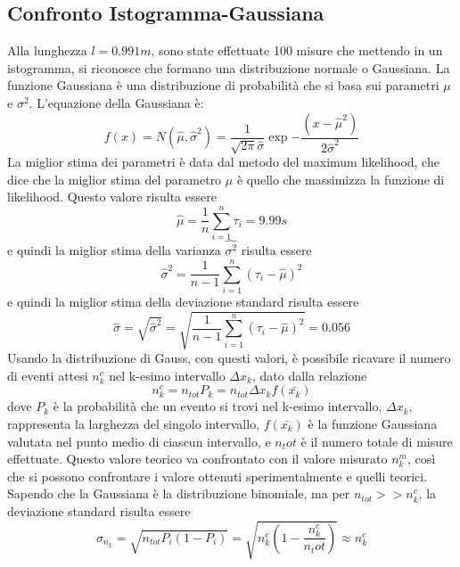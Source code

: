 \documentclass[a4paper]{article}
\begin{document}
\subsection{Confronto Istogramma-Gaussiana}
Alla lunghezza $l=0.991m$, sono state effettuate 100 misure che mettendo in un istogramma, si riconosce che formano una distribuzione normale o Gaussiana. La funzione Gaussiana è una distribuzione di probabilità che si basa sui parametri $\mu$ e $\sigma^2$. L'equazione della Gaussiana è:
\begin{equation}
    f(x)=N(\hat{\mu}, \hat{\sigma}^2) = \frac{1}{\sqrt{2\pi}\hat{\sigma}}\exp{-\frac{(x-\hat{\mu}^2)}{2\hat{\sigma}^2}}
\end{equation}
La miglior stima dei parametri è data dal metodo del maximum likelihood, che dice che la miglior stima del parametro $\mu$ è quello che massimizza la funzione di likelihood. Questo valore risulta essere 
\begin{equation}
    \hat{\mu} = \frac{1}{n} \sum_{i=1}^{n}\tau_i = 9.99s
\end{equation}
e quindi la miglior stima della varianza $\hat{\sigma^2}$ risulta essere 
\begin{equation}
    \hat{\sigma}^2 = \frac{1}{n-1} \sum_{i=1}^{n}(\tau_i - \hat{\mu})^2
\end{equation}
e quindi la miglior stima della deviazione standard risulta essere 
\begin{equation}
    \hat{\sigma} = \sqrt{\hat{\sigma}^2} = \sqrt{\frac{1}{n-1} \sum_{i=1}^{n}(\tau_i - \hat{\mu})^2} = 0.056
\end{equation}
Usando la distribuzione di Gauss, con questi valori, è possibile ricavare il numero di eventi attesi $n_k^c$ nel k-esimo intervallo $\Delta x_k$, dato dalla relazione 
\begin{equation}
    n^c_k = n_{tot} P_k = n_{tot} \Delta x_k f(\bar{x_k})
\end{equation}
dove $P_k$ è la probabilità che un evento si trovi nel k-esimo intervallo, $\Delta x_k$, rappresenta la larghezza del singolo intervallo, $f(\bar{x_k})$ è la funzione Gaussiana valutata nel punto medio di ciascun intervallo, e $n_tot$ è il numero totale di misure effettuate. Questo valore teorico va confrontato con il valore misurato $n^m_k$, così che si possono confrontare i valore ottenuti sperimentalmente e quelli teorici. Sapendo che la Gaussiana è la distribuzione binomiale, ma per $n_{tot} >> n_k^c$, la deviazione standard risulta essere 
\begin{equation}
    \sigma_{n_k} = \sqrt{n_{tot}P_i(1-P_i)} = \sqrt{n^c_k (1-\frac{n_k^c}{n_tot})} \approx n^c_k
\end{equation}
\end{document}
